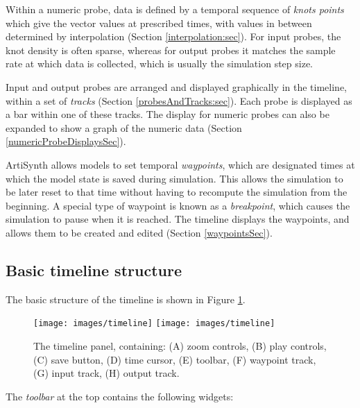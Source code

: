\documentclass{article}
\begin{document}
Within a numeric probe, data is defined by a temporal sequence of {\it
knots points} which give the vector values at prescribed times, with
values in between determined by interpolation (Section
\ref{interpolation:sec}). For input probes, the knot density is often
sparse, whereas for output probes it matches the sample rate at which
data is collected, which is usually the simulation step size.

Input and output probes are arranged and displayed graphically in the
timeline, within a set of {\it tracks} (Section
\ref{probesAndTracks:sec}). Each probe is displayed as a bar within
one of these tracks. The display for numeric probes can also be
expanded to show a graph of the numeric data (Section
\ref{numericProbeDisplaysSec}).

ArtiSynth allows models to set temporal {\it waypoints}, which are
designated times at which the model state is saved during
simulation. This allows the simulation to be later reset to that time
without having to recompute the simulation from the beginning.  A
special type of waypoint is known as a {\it breakpoint}, which causes
the simulation to pause when it is reached. The timeline displays the
waypoints, and allows them to be created and edited (Section
\ref{waypointsSec}).

\subsection{Basic timeline structure}

The basic structure of the timeline is shown in 
Figure \ref{timelineFig}.

\begin{figure}[h]
\begin{center}
\iflatexml
\texttt{[image: images/timeline]}
\else
\texttt{[image: images/timeline]}
\fi
\end{center}
\caption{The timeline panel, containing: (A) zoom controls, (B) play
controls, (C) save button, (D) time cursor, (E) toolbar, (F) waypoint
track, (G) input track, (H) output track.}%
\label{timelineFig}
\end{figure}

The {\it toolbar} at the top contains the following widgets:
\end{document}
